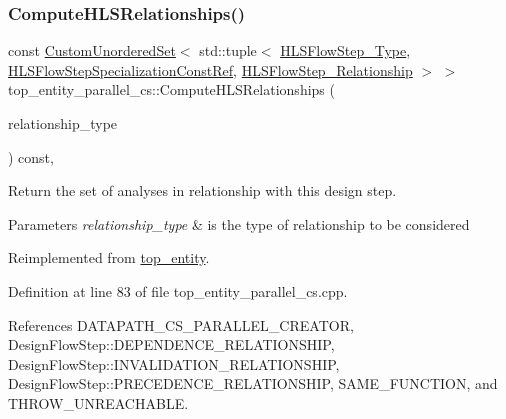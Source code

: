 \subsubsection{\texorpdfstring{Compute\+H\+L\+S\+Relationships()}{ComputeHLSRelationships()}}
{\footnotesize\ttfamily const \hyperlink{classCustomUnorderedSet}{Custom\+Unordered\+Set}$<$ std\+::tuple$<$ \hyperlink{hls__step_8hpp_ada16bc22905016180e26fc7e39537f8d}{H\+L\+S\+Flow\+Step\+\_\+\+Type}, \hyperlink{hls__step_8hpp_a5fdd2edf290c196531d21d68e13f0e74}{H\+L\+S\+Flow\+Step\+Specialization\+Const\+Ref}, \hyperlink{hls__step_8hpp_a3ad360b9b11e6bf0683d5562a0ceb169}{H\+L\+S\+Flow\+Step\+\_\+\+Relationship} $>$ $>$ top\+\_\+entity\+\_\+parallel\+\_\+cs\+::\+Compute\+H\+L\+S\+Relationships (\begin{DoxyParamCaption}\item[{const \hyperlink{classDesignFlowStep_a723a3baf19ff2ceb77bc13e099d0b1b7}{Design\+Flow\+Step\+::\+Relationship\+Type}}]{relationship\+\_\+type }\end{DoxyParamCaption}) const\hspace{0.3cm}{\ttfamily [protected]}, {\ttfamily [virtual]}}



Return the set of analyses in relationship with this design step. 


\begin{DoxyParams}{Parameters}
{\em relationship\+\_\+type} & is the type of relationship to be considered \\
\hline
\end{DoxyParams}


Reimplemented from \hyperlink{classtop__entity_a414a49e2195ed1b077e625a546f64427}{top\+\_\+entity}.



Definition at line 83 of file top\+\_\+entity\+\_\+parallel\+\_\+cs.\+cpp.



References D\+A\+T\+A\+P\+A\+T\+H\+\_\+\+C\+S\+\_\+\+P\+A\+R\+A\+L\+L\+E\+L\+\_\+\+C\+R\+E\+A\+T\+OR, Design\+Flow\+Step\+::\+D\+E\+P\+E\+N\+D\+E\+N\+C\+E\+\_\+\+R\+E\+L\+A\+T\+I\+O\+N\+S\+H\+IP, Design\+Flow\+Step\+::\+I\+N\+V\+A\+L\+I\+D\+A\+T\+I\+O\+N\+\_\+\+R\+E\+L\+A\+T\+I\+O\+N\+S\+H\+IP, Design\+Flow\+Step\+::\+P\+R\+E\+C\+E\+D\+E\+N\+C\+E\+\_\+\+R\+E\+L\+A\+T\+I\+O\+N\+S\+H\+IP, S\+A\+M\+E\+\_\+\+F\+U\+N\+C\+T\+I\+ON, and T\+H\+R\+O\+W\+\_\+\+U\+N\+R\+E\+A\+C\+H\+A\+B\+LE.

\mbox{\label{classtop__entity__parallel__cs_ac1a4001c3ec07d0ccda26536fe1a9326}} 
